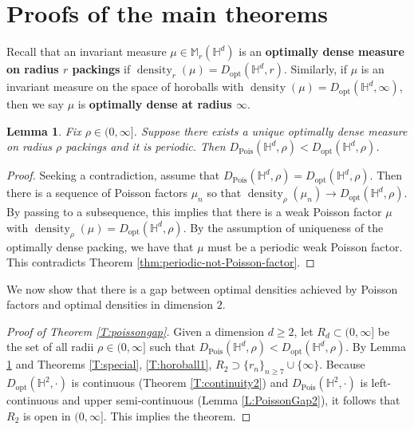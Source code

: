 \documentclass[11pt]{amsart}
\newtheorem{lemma}[theorem]{Lemma}
\theoremstyle{definition}
\theoremstyle{remark}
\renewcommand{\H}{\mathbb{H}}
\newcommand{\M}{\mathbb{M}}
\newcommand{\density}{\operatorname{density}}
\newcommand{\opt}{\operatorname{opt}}
\newcommand{\Pois}{\operatorname{Pois}}
\newcommand{\Dopt}{D_{\opt}}
\begin{document}
\section{Proofs of the main theorems}
\label{secPoissonGap}




     

 Recall that an invariant measure $\mu \in \M_r(\H^d)$ is an {\bf optimally dense measure on radius $r$ packings} if $\density_r(\mu)=D_{\opt}(\H^d,r)$. Similarly, if $\mu$ is an invariant measure on the space of horoballs with $\density(\mu)=D_{\opt}(\H^d,\infty)$, then we say $\mu$ is {\bf optimally dense at radius $\infty$}.


\begin{lemma}\label{L:PoissonGap1}
    Fix $\rho \in (0,\infty]$. Suppose there exists a unique optimally dense measure on radius $\rho$ packings and it is periodic. Then
        $D_{\Pois}(\H^d,\rho)<\Dopt(\H^d,\rho)$.
\end{lemma}
\begin{proof}
 Seeking a contradiction, assume that $D_{\Pois}(\H^d,\rho)  = \Dopt(\H^d,\rho)$. Then there is a sequence of Poisson factors $\mu_n$ so that $\density_\rho(\mu_n) \to \Dopt(\H^d,\rho)$.  By passing to a subsequence, this implies that there is a weak Poisson factor $\mu$ with $\density_\rho(\mu) = \Dopt(\H^d,\rho)$.  By the assumption of uniqueness of the optimally dense packing, we have that $\mu$ must be a periodic weak Poisson factor.  This contradicts Theorem \ref{thm:periodic-not-Poisson-factor}. 
\end{proof}





We now show that there is a gap between optimal densities achieved by Poisson factors and optimal densities in dimension $2$.

\begin{proof}[Proof of Theorem \ref{T:poissongap}]
Given a dimension $d\ge 2$, let $R_d \subset (0,\infty]$ be the set of all radii $\rho \in (0,\infty]$ such that $D_{\Pois}(\H^d,\rho)<\Dopt(\H^d,\rho)$. By Lemma \ref{L:PoissonGap1} and Theorems \ref{T:special}, \ref{T:horoball1}, $R_2 \supset \{r_n\}_{n\ge 7} \cup \{\infty\}$. Because $D_{\opt}(\H^2,\cdot)$ is continuous (Theorem \ref{T:continuity2}) and $D_{\Pois}(\H^2,\cdot)$ is left-continuous and upper semi-continuous (Lemma \ref{L:PoissonGap2}), it follows that $R_2$ is open in $(0,\infty]$. This implies the theorem.
\end{proof}
\end{document}
